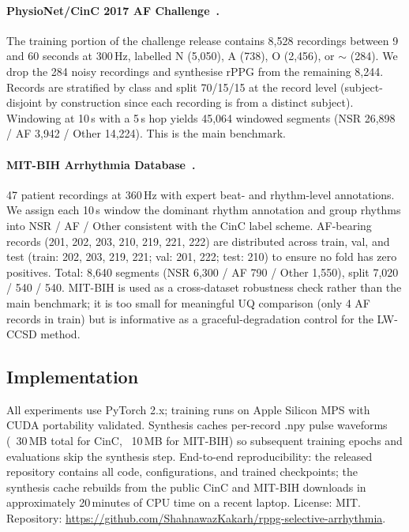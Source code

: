 \documentclass[journal]{IEEEtran}
\begin{document}
\paragraph{PhysioNet/CinC 2017 AF Challenge~\cite{clifford2017cinc}.} The training portion of the challenge release contains 8{,}528 recordings between 9 and 60 seconds at 300\,Hz, labelled N (5{,}050), A (738), O (2{,}456), or $\sim$ (284). We drop the 284 noisy recordings and synthesise rPPG from the remaining 8{,}244. Records are stratified by class and split 70/15/15 at the record level (subject-disjoint by construction since each recording is from a distinct subject). Windowing at 10\,s with a 5\,s hop yields 45{,}064 windowed segments (NSR 26{,}898 / AF 3{,}942 / Other 14{,}224). This is the main benchmark.

\paragraph{MIT-BIH Arrhythmia Database~\cite{moody2001mitbih}.} 47 patient recordings at 360\,Hz with expert beat- and rhythm-level annotations. We assign each 10\,s window the dominant rhythm annotation and group rhythms into NSR / AF / Other consistent with the CinC label scheme. AF-bearing records (201, 202, 203, 210, 219, 221, 222) are distributed across train, val, and test (train: 202, 203, 219, 221; val: 201, 222; test: 210) to ensure no fold has zero positives. Total: 8{,}640 segments (NSR 6{,}300 / AF 790 / Other 1{,}550), split 7{,}020 / 540 / 540. MIT-BIH is used as a cross-dataset robustness check rather than the main benchmark; it is too small for meaningful UQ comparison (only 4 AF records in train) but is informative as a graceful-degradation control for the LW-CCSD method.

\subsection{Implementation}
All experiments use PyTorch 2.x; training runs on Apple Silicon MPS with CUDA portability validated. Synthesis caches per-record .npy pulse waveforms (~30\,MB total for CinC, ~10\,MB for MIT-BIH) so subsequent training epochs and evaluations skip the synthesis step. End-to-end reproducibility: the released repository contains all code, configurations, and trained checkpoints; the synthesis cache rebuilds from the public CinC and MIT-BIH downloads in approximately 20\,minutes of CPU time on a recent laptop. License: MIT. Repository: \url{https://github.com/ShahnawazKakarh/rppg-selective-arrhythmia}.
\end{document}
